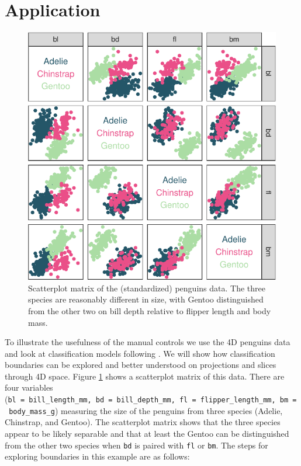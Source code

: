 \documentclass[]{interact}
\theoremstyle{plain}%
\theoremstyle{definition}
\theoremstyle{remark}
\begin{document}
\hypertarget{sec:examples}{%
\section{Application}\label{sec:examples}}

\begin{figure}

{\centering \includegraphics[width=0.6\linewidth]{paper_files/figure-latex/penguins-scatmat-1} 

}

\caption{Scatterplot matrix of the (standardized) penguins data. The three species are reasonably different in size, with Gentoo distinguished from the other two on bill depth relative to flipper length and body mass.}\label{fig:penguins-scatmat}
\end{figure}

To illustrate the usefulness of the manual controls we use the 4D
penguins data \citep{penguins} and look at classification models
following \citet{sam11271}. We will show how classification boundaries
can be explored and better understood on projections and slices through
4D space. Figure \ref{fig:penguins-scatmat} shows a scatterplot matrix
of this data. There are four variables
(\texttt{bl\ =\ bill\_length\_mm,\ bd\ =\ bill\_depth\_mm,\ fl\ =\ flipper\_length\_mm,\ bm\ =\ body\_mass\_g})
measuring the size of the penguins from three species (Adelie,
Chinstrap, and Gentoo). The scatterplot matrix shows that the three
species appear to be likely separable and that at least the Gentoo can
be distinguished from the other two species when \texttt{bd} is paired
with \texttt{fl} or \texttt{bm}. The steps for exploring boundaries in
this example are as follows:
\end{document}
